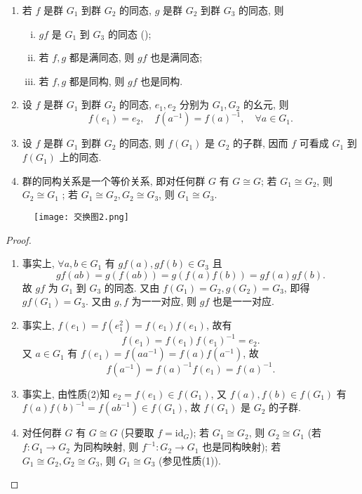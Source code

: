 \documentclass[../../main.tex]{subfiles}
\begin{document}
\begin{theorem}[群同态与同构的基本性质]
\begin{enumerate}[(1)]
\item 若 \( f \) 是群 \( G_1 \) 到群 \( G_2 \) 的同态, \( g \) 是群 \( G_2 \) 到群 \( G_3 \) 的同态, 则
\begin{enumerate}[(i)]
\item \( gf \) 是 \( G_1 \) 到 \( G_3 \) 的同态 ();
\item 若 \( f,g \) 都是满同态, 则 \( gf \) 也是满同态;
\item 若 \( f,g \) 都是同构, 则 \( gf \) 也是同构.
\end{enumerate}

\item 设 \( f \) 是群 \( G_1 \) 到群 \( G_2 \) 的同态, \( e_1,e_2 \) 分别为 \( G_1,G_2 \) 的幺元, 则
\[
f(e_1) = e_2, \quad f(a^{-1}) = f(a)^{-1}, \quad \forall a \in G_1.
\]

\item 设 \( f \) 是群 \( G_1 \) 到群 \( G_2 \) 的同态, 则 \( f(G_1) \) 是 \( G_2 \) 的子群, 因而 \( f \) 可看成 \( G_1 \) 到 \( f(G_1) \) 上的同态.

\item  群的同构关系是一个等价关系, 即对任何群 \( G \) 有 \( G \cong G \); 若 \( G_1 \cong G_2 \), 则 \( G_2 \cong G_1 \) ; 若 \( G_1 \cong G_2, G_2 \cong G_3 \), 则 \( G_1 \cong G_3 \).
\end{enumerate}
\end{theorem}
\begin{figure}[H]
\centering
\texttt{[image: 交换图2.png]}
\caption{}
\label{figure:{交换图2}}
\end{figure}
\begin{proof}
\begin{enumerate}[(1)]
\item 事实上, \( \forall a,b \in G_1 \) 有 \( gf(a), gf(b) \in G_3 \) 且
\[
gf(ab) = g(f(ab)) = g(f(a)f(b)) = gf(a)gf(b).
\]
故 \( gf \) 为 \( G_1 \) 到 \( G_3 \) 的同态. 又由 \( f(G_1) = G_2, g(G_2) = G_3 \), 即得 \( gf(G_1) = G_3 \). 又由 \( g,f \) 为一一对应, 则 \( gf \) 也是一一对应.

\item 事实上, \( f(e_1) = f(e_1^2) = f(e_1)f(e_1) \), 故有
\[
f(e_1) = f(e_1)f(e_1)^{-1} = e_2.
\]
又 \( a \in G_1 \) 有 \( f(e_1) = f(aa^{-1}) = f(a)f(a^{-1}) \), 故
\[
f(a^{-1}) = f(a)^{-1}f(e_1) = f(a)^{-1}.
\]

\item 事实上, 由性质(2)知 \( e_2 = f(e_1) \in f(G_1) \), 又 \( f(a),f(b) \in f(G_1) \) 有 \( f(a)f(b)^{-1} = f(ab^{-1}) \in f(G_1) \), 故 \( f(G_1) \) 是 \( G_2 \) 的子群.

\item 对任何群 \( G \) 有 \( G \cong G \) (只要取 \( f = \text{id}_G \)); 若 \( G_1 \cong G_2 \), 则 \( G_2 \cong G_1 \) (若 \( f: G_1 \to G_2 \) 为同构映射, 则 \( f^{-1}: G_2 \to G_1 \) 也是同构映射); 若 \( G_1 \cong G_2, G_2 \cong G_3 \), 则 \( G_1 \cong G_3 \) (参见性质(1)).
\end{enumerate}

\end{proof}
\end{document}
